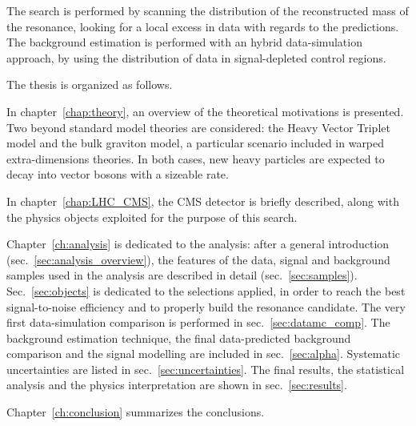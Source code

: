 \noindent The search is performed by scanning the distribution of the reconstructed mass of the resonance, looking for a local excess in data with regards to the predictions. The background estimation is performed with an hybrid data-simulation approach, by using the distribution of data in signal-depleted control regions.

\newpage

\noindent The thesis is organized as follows.

\vspace*{1\baselineskip}

\noindent In chapter~\ref{chap:theory}, an overview of the theoretical motivations is presented. Two beyond standard model theories are considered: the Heavy Vector Triplet model and the bulk graviton model, a particular scenario included in warped extra-dimensions theories. In both cases, new heavy particles are expected to decay into vector bosons with a sizeable rate.

\vspace*{1\baselineskip}

\noindent In chapter~\ref{chap:LHC_CMS}, the CMS detector is briefly described, along with the physics objects exploited for the purpose of this search.

\vspace*{1\baselineskip}

\noindent Chapter~\ref{ch:analysis} is dedicated to the analysis: after a general introduction (sec.~\ref{sec:analysis_overview}), the features of the data, signal and background samples used in the analysis are described in detail (sec.~\ref{sec:samples}). Sec.~\ref{sec:objects} is dedicated to the selections applied, in order to reach the best signal-to-noise efficiency and to properly build the resonance candidate. The very first data-simulation comparison is performed in sec.~\ref{sec:datamc_comp}. The background estimation technique, the final data-predicted background comparison and the signal modelling are included in sec.~\ref{sec:alpha}. Systematic uncertainties are listed in sec.~\ref{sec:uncertainties}. The final results, the statistical analysis and the physics interpretation are shown in sec.~\ref{sec:results}.

\vspace*{1\baselineskip}

\noindent Chapter~\ref{ch:conclusion} summarizes the conclusions.

\clearpage

